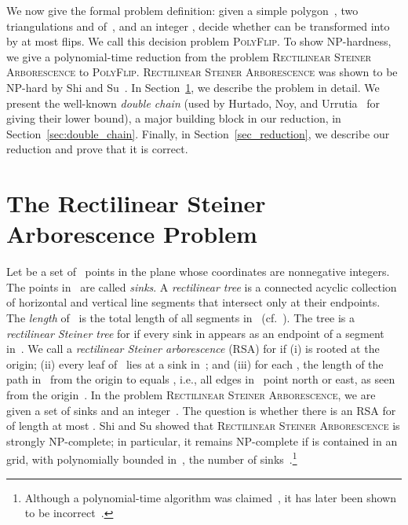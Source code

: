 \documentclass[a4paper,11pt]{article}
\begin{document}
We now give the formal problem definition:
given a simple polygon~, two triangulations 
 and  of~, and an integer , decide whether
 can be transformed into  by at most  flips.
We call this decision problem \textsc{PolyFlip}.
To show NP-hardness, we give a polynomial-time reduction from
the problem \textsc{Rectilinear Steiner Arborescence} to \textsc{PolyFlip}.
\textsc{Rectilinear Steiner Arborescence} was shown to be NP-hard by Shi and Su~\cite{shi_su}.
In Section~\ref{sec:RSA}, we describe the problem in detail. 
We present the well-known \emph{double chain}
(used by Hurtado, Noy, and Urrutia~\cite{hurtado_noy_urrutia} for giving their lower bound), a major 
building block in our reduction, in Section~\ref{sec:double_chain}.
Finally, in Section~\ref{sec_reduction}, we describe our reduction
and prove that it is correct.

\section{The Rectilinear Steiner Arborescence Problem}
\label{sec:RSA}
Let  be a set of~ points in the plane whose coordinates are nonnegative integers. 
The points in~ are called \emph{sinks}. 
A \emph{rectilinear tree}  is a connected acyclic collection of horizontal 
and vertical line segments that intersect only at their endpoints.
The \emph{length} of~ is the total length of all segments in~ 
(cf.~\cite[p.~205]{hwang}).
The tree  is a \emph{rectilinear Steiner tree} for  if every sink in 
 appears as an endpoint of a segment in~. 
We call  a \emph{rectilinear Steiner arborescence} (RSA) for  if (i)  is 
rooted at the origin; (ii) every leaf of~ lies at a sink in~; and (iii) for 
each , the length of the path in~ from the origin to  
equals , i.e., all edges in~ point north or east, as seen from the origin~\cite{rao}.
In the problem 
\textsc{Rectilinear Steiner Arborescence}, we are given a set of sinks  and an integer~. The question
is whether there is an RSA for  of length at most . 
Shi and Su showed that \textsc{Rectilinear Steiner Arborescence} is strongly 
NP-complete; in particular, it 
remains NP-complete if  is contained in an  grid, with  
polynomially bounded in~, the number of
sinks~\cite{shi_su}.\footnote{Although a  polynomial-time algorithm was 
claimed~\cite{trubin}, it has later been shown to be incorrect~\cite{rao}.}
\end{document}
